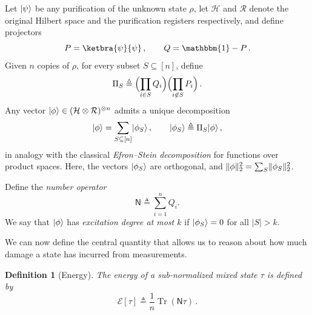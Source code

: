 \documentclass[10pt]{article}
\DeclarePairedDelimiter{\ket}{\lvert}{\rangle}%
\DeclarePairedDelimiter\norm{\lVert}{\rVert}
\newcommand{\energy}{\mathcal{E}}
\DeclareMathOperator{\Tr}{Tr}
\newcommand{\Id}{\mathbbm{1}}
\newtheorem{definition}[theorem]{Definition}
\newcommand{\sitan}[1]{{\color{red}[sitan: #1]}}
\renewcommand{\sitan}[1]{}
\begin{document}
Let $\ket{\psi}$ be any purification of the unknown state $\rho$, let $\mathcal{H}$ and $\mathcal{R}$ denote the original Hilbert space and the purification registers respectively, and define projectors
\begin{equation}
    P = \ketbra{\psi}{\psi}\,, \qquad Q = \Id - P\,.
\end{equation}
Given $n$ copies of $\rho$, for every subset $S\subseteq[n]$, define
\begin{equation}
    \Pi_S \triangleq \Bigl(\prod_{i\in S} Q_i\Bigr)\Bigl(\prod_{i\not\in S} P_i\Bigr)\,.
\end{equation}
Any vector $\ket{\phi}\in (\mathcal{H}\otimes \mathcal{R})^{\otimes n}$ admits a unique decomposition
\begin{equation}
    \ket{\phi} = \sum_{S\subseteq[n]} \ket{\phi_S}\,, \qquad \ket{\phi_S} \triangleq \Pi_S \ket{\phi}\,,
\end{equation}
in analogy with the classical \emph{Efron--Stein decomposition} for functions over product spaces. Here, the vectors $\ket{\phi_S}$ are orthogonal, and $\norm{\phi}^2_2 = \sum_S \norm{\phi_S}^2_2$.

Define the \emph{number operator}
\begin{equation}
    \mathsf{N}\triangleq\sum_{i=1}^nQ_i.
\end{equation}
We say that $\ket{\phi}$ has \emph{excitation degree at most $k$} if $\ket{\phi_S} = 0$ for all $|S| > k$.

We can now define the central quantity that allows us to reason about how much damage a state has incurred from measurements.

\begin{definition}[Energy]
    The \emph{energy} of a sub-normalized mixed state $\tau$ is defined by
    \begin{equation}
        \energy[\tau] \triangleq \frac{1}{n}\Tr(\mathsf{N}\tau)\,.
    \end{equation}
\end{definition}
\end{document}
